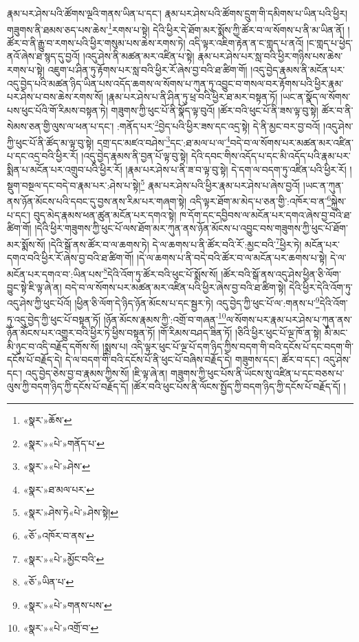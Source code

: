 རྣམ་པར་ཤེས་པའི་ཚོགས་ལྔའི་གནས་ཡིན་པ་དང་། རྣམ་པར་ཤེས་པའི་ཚོགས་དྲུག་གི་དམིགས་པ་ཡིན་པའི་ཕྱིར། གཟུགས་ནི་ཐམས་ཅད་པས་ཆེས་\footnote{«སྣར་»ཆོས་}རགས་པ་སྟེ། དེའི་ཕྱིར་དེ་ཐོག་མར་སྨོས་ཀྱི་ཚོར་བ་ལ་སོགས་པ་ནི་མ་ཡིན་ནོ། །ཚོར་བ་ནི་རྒྱུ་བ་རགས་པའི་ཕྱིར་གསུམ་པས་ཆེས་རགས་ཏེ། འདི་ལྟར་འཇིག་རྟེན་ན་ང་གླད་པ་ནའོ། །ང་གླད་པ་ཕྱེད་ནའོ་ཞེས་ཐ་སྙད་དུ་བྱའོ། །འདུ་ཤེས་ནི་མཚན་མར་འཛིན་པ་སྟེ། རྣམ་པར་ཤེས་པར་སླ་བའི་ཕྱིར་གཉིས་པས་ཆེས་རགས་པ་སྟེ། འཇུག་པ་ཤིན་ཏུ་རྟོགས་པར་སླ་བའི་ཕྱིར་རོ་ཞེས་བྱ་བའི་ཐ་ཚིག་གོ། །འདུ་བྱེད་རྣམས་ནི་མངོན་པར་འདུ་བྱེད་པའི་མཚན་ཉིད་ཡིན་པས་འདོད་ཆགས་ལ་སོགས་པ་ཀུན་ཏུ་འབྱུང་བ་གསལ་བར་རྟོགས་པའི་ཕྱིར་རྣམ་པར་ཤེས་པ་བས་ཆེས་རགས་སོ། །རྣམ་པར་ཤེས་པ་ནི་ཤིན་ཏུ་ཕྲ་བའི་ཕྱིར་ཐ་མར་བསྟན་ཏོ། །ཡང་ན་སྣོད་ལ་སོགས་པས་ཕུང་པོའི་གོ་རིམས་བསྟན་ཏེ། གཟུགས་ཀྱི་ཕུང་པོ་ནི་སྣོད་ལྟ་བུའོ། །ཚོར་བའི་ཕུང་པོ་ནི་ཟས་ལྟ་བུ་སྟེ། ཚོར་བ་ནི་སེམས་ཅན་གྱི་ལུས་ལ་ཕན་པ་དང་། :གནོད་པར་\footnote{«སྣར་»«པེ་»གནོད་པ་}བྱེད་པའི་ཕྱིར་ཟས་དང་འདྲ་སྟེ། དེ་ནི་མྱང་བར་བྱ་བའོ། །འདུ་ཤེས་ཀྱི་ཕུང་པོ་ནི་ཚོད་མ་ལྟ་བུ་སྟེ། དགྲ་དང་མཛའ་བཤེས་\footnote{«སྣར་»«པེ་»ཤེས་}དང་:ཐ་མལ་པ་ལ་\footnote{«སྣར་»ཐ་མལ་པར་}བདེ་བ་ལ་སོགས་པར་མཚན་མར་འཛིན་པ་དང་འདྲ་བའི་ཕྱིར་རོ། །འདུ་བྱེད་རྣམས་ནི་བྱན་པོ་ལྟ་བུ་སྟེ། དེའི་དབང་གིས་འདོད་པ་དང་མི་འདོད་པའི་རྣམ་པར་སྨིན་པ་མངོན་པར་འགྲུབ་པའི་ཕྱིར་རོ། །རྣམ་པར་ཤེས་པ་ནི་ཟ་བ་ལྟ་བུ་སྟེ། དེ་དག་ལ་བདག་ཏུ་འཛིན་པའི་ཕྱིར་རོ། །སྡུག་བསྔལ་དང་བདེ་བ་རྣམ་པར་:ཤེས་པ་སྟེ།\footnote{«སྣར་»ཤེས་ཏེ«པེ་»ཤེས་སྟེ།} རྣམ་པར་ཤེས་པའི་ཕྱིར་རྣམ་པར་ཤེས་པ་ཞེས་བྱའོ། །ཡང་ན་ཀུན་ནས་ཉོན་མོངས་པའི་དབང་དུ་བྱས་ནས་རིམ་པར་གཞག་སྟེ། འདི་ལྟར་ཐོག་མ་མེད་པ་ཅན་གྱི་:འཁོར་བ་ན་\footnote{«ཅོ་»འཁོར་བ་ནས་}སྐྱེས་པ་དང་། བུད་མེད་རྣམས་ཕན་ཚུན་མངོན་པར་དགའ་སྟེ། ཁ་དོག་དང་དབྱིབས་ལ་མངོན་པར་དགའ་ཞེས་བྱ་བའི་ཐ་ཚིག་གོ། །དེའི་ཕྱིར་གཟུགས་ཀྱི་ཕུང་པོ་ལས་ཐོག་མར་ཀུན་ནས་ཉོན་མོངས་པ་འབྱུང་བས་གཟུགས་ཀྱི་ཕུང་པོ་ཐོག་མར་སྨོས་སོ། །དེའི་སྒོ་ནས་ཚོར་བ་ལ་ཆགས་ཏེ། དེ་ལ་ཆགས་པ་ནི་ཚོར་བའི་རོ་:མྱང་བའི་\footnote{«སྣར་»«པེ་»མྱོང་བའི་}ཕྱིར་ཏེ། མངོན་པར་དགའ་བའི་ཕྱིར་རོ་ཞེས་བྱ་བའི་ཐ་ཚིག་གོ། །དེ་ལ་ཆགས་པ་ནི་བདེ་བའི་ཚོར་བ་ལ་མངོན་པར་ཆགས་པ་སྟེ། དེ་ལ་མངོན་པར་དགའ་བ་:ཡིན་པས་\footnote{«ཅོ་»ཡིན་པ་}དེའི་འོག་ཏུ་ཚོར་བའི་ཕུང་པོ་སྨོས་སོ། །ཚོར་བའི་སྒོ་ནས་འདུ་ཤེས་ཕྱིན་ཅི་ལོག་བྱུང་སྟེ་ཇི་ལྟ་ཞེ་ན། བདེ་བ་ལ་སོགས་པར་མཚན་མར་འཛིན་པའི་ཕྱིར་ཞེས་བྱ་བའི་ཐ་ཚིག་སྟེ། དེའི་ཕྱིར་དེའི་འོག་ཏུ་འདུ་ཤེས་ཀྱི་ཕུང་པོའོ། །ཕྱིན་ཅི་ལོག་དེ་ཉིད་ཉོན་མོངས་པ་དང་སྦྱར་ཏེ། འདུ་བྱེད་ཀྱི་ཕུང་པོ་ལ་:གནས་པ་\footnote{«སྣར་»«པེ་»གནས་པས་}དེའི་འོག་ཏུ་འདུ་བྱེད་ཀྱི་ཕུང་པོ་བསྟན་ཏོ། །ཉོན་མོངས་རྣམས་ཀྱི་:འགྲོ་བ་གཞན་\footnote{«སྣར་»«པེ་»འགྲོ་བ་}ལ་སོགས་པར་རྣམ་པར་ཤེས་པ་ཀུན་ནས་ཉོན་མོངས་པར་འགྱུར་བའི་ཕྱིར་ཏེ་ཕྱིས་བསྟན་ཏོ། །གོ་རིམས་བཤད་ཟིན་ཏོ། །ཅིའི་ཕྱིར་ཕུང་པོ་ལྔ་ཁོ་ན་སྟེ། མི་མང་མི་ཉུང་བ་འདི་བརྗོད་དགོས་སོ། །སྨྲས་པ། འདི་ལྟར་ཕུང་པོ་ལྔ་པོ་དག་ཉིད་ཀྱིས་བདག་གི་བའི་དངོས་པོ་དང་བདག་གི་དངོས་པོ་བརྗོད་དེ། དེ་ལ་བདག་གི་བའི་དངོས་པོ་ནི་ཕུང་པོ་བཞིས་བརྗོད་དེ། གཟུགས་དང་། ཚོར་བ་དང་། འདུ་ཤེས་དང་། འདུ་བྱེད་ཅེས་བྱ་བ་རྣམས་ཀྱིས་སོ། །ཇི་ལྟ་ཞེ་ན། གཟུགས་ཀྱི་ཕུང་པོས་ནི་ཡོངས་སུ་འཛིན་པ་དང་བཅས་པ་ལུས་ཀྱི་བདག་ཉིད་ཀྱི་དངོས་པོ་བརྗོད་དོ། །ཚོར་བའི་ཕུང་པོས་ནི་ལོངས་སྤྱོད་ཀྱི་བདག་ཉིད་ཀྱི་དངོས་པོ་བརྗོད་དོ། །
